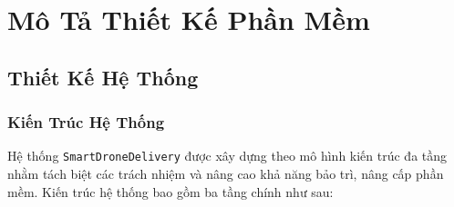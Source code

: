 \chapter{Mô Tả Thiết Kế Phần Mềm}

\section{Thiết Kế Hệ Thống}

\subsection{Kiến Trúc Hệ Thống}

Hệ thống \texttt{SmartDroneDelivery} được xây dựng theo mô hình kiến trúc đa tầng nhằm tách biệt các trách nhiệm và nâng cao khả năng bảo trì, nâng cấp phần mềm. Kiến trúc hệ thống bao gồm ba tầng chính như sau:

